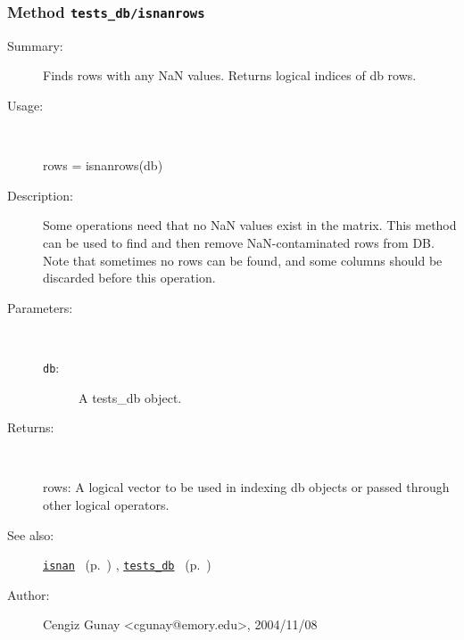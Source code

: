\subsubsection[Method \texttt{isnanrows}]{Method \texttt{tests\_db/isnanrows}}%
%
\label{ref_tests_db__isnanrows}%
\hypertarget{ref_tests_db__isnanrows}{}%
\begin{description}
\item[Summary:]Finds rows with any NaN values. Returns logical indices of db rows.
%
\item[Usage:]~%
\begin{lyxcode}%
rows = isnanrows(db)
%
\end{lyxcode}%
%
\item[Description:]%
Some operations need that no NaN values exist in the matrix. This method
 can be used to find and then remove NaN-contaminated rows from DB. Note
 that sometimes no rows can  be found, and some columns should be discarded
 before this operation.
\item[Parameters:]~
\begin{description}%
\item[\texttt{db}:]
 A tests\_db object.
\end{description}%
%
\item[Returns:]~

	rows: A logical vector to be used in indexing db objects or passed
		through other logical operators. 
%
%
\item[See also:]%
\hyperlink{ref_isnan}{\texttt{isnan}}%
\ (p.~\pageref{ref_isnan})%
%
, \hyperlink{ref_tests_db}{\texttt{tests\_db}}%
\ (p.~\pageref{ref_tests_db})%
%
%
\item[Author:]%
Cengiz Gunay <cgunay@emory.edu>, 2004/11/08%
\end{description}
\methodline%
